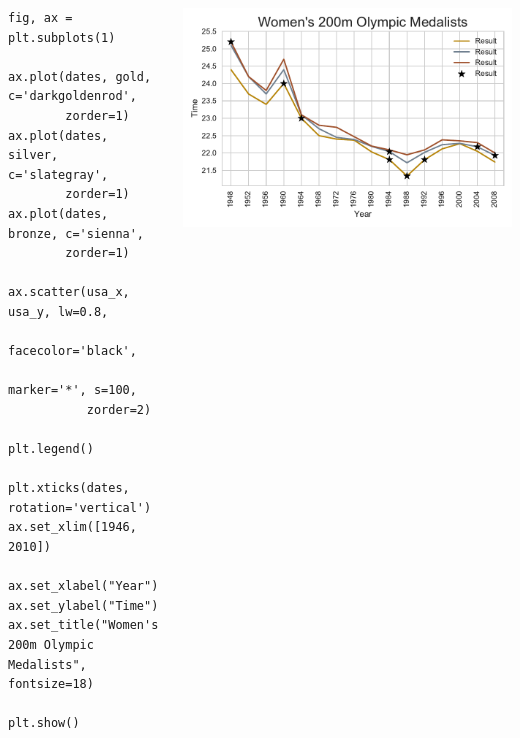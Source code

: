 \documentclass{beamer}
\begin{document}
\begin{frame}[fragile]
\tiny{
\begin{columns}
\begin{column}{0.45\textwidth}
\begin{verbatim}
fig, ax = plt.subplots(1)

ax.plot(dates, gold, c='darkgoldenrod',
        zorder=1)
ax.plot(dates, silver, c='slategray',
        zorder=1)
ax.plot(dates, bronze, c='sienna',
        zorder=1)

ax.scatter(usa_x, usa_y, lw=0.8,
           facecolor='black',
           marker='*', s=100,
           zorder=2)

plt.legend()

plt.xticks(dates, rotation='vertical')
ax.set_xlim([1946, 2010])

ax.set_xlabel("Year")
ax.set_ylabel("Time")
ax.set_title("Women's 200m Olympic Medalists", fontsize=18)

plt.show()
\end{verbatim}
\end{column}
\begin{column}{0.55\textwidth}
\includegraphics[width=\textwidth]{../olympics_7.pdf}
\end{column}
\end{columns}
}
\end{frame}
\end{document}
